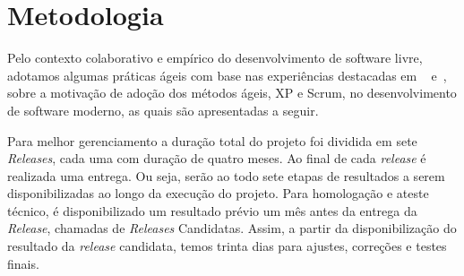 \section{Metodologia}
\label{sec:metodologia}

%
%
%

Pelo contexto colaborativo e empírico do desenvolvimento de software livre,
adotamos algumas práticas ágeis com base nas experiências destacadas em
~\cite{schwaber2001} e~\cite{fitzgerald2006}, sobre a motivação de adoção dos métodos ágeis, XP e Scrum, no desenvolvimento de software moderno, as quais são apresentadas a seguir.



Para melhor gerenciamento a duração total do projeto foi dividida em sete \textit{Releases}, cada uma com duração de quatro meses. Ao final de cada \textit{release} é realizada uma entrega. Ou seja, serão ao todo sete etapas de resultados a serem disponibilizadas ao longo da execução do projeto.
Para homologação e ateste técnico, é disponibilizado um resultado prévio um mês antes da entrega da \textit{Release}, chamadas de \textit{Releases} Candidatas. Assim, a partir da disponibilização do resultado da \textit{release} candidata, temos trinta dias para ajustes, correções e testes finais. 

